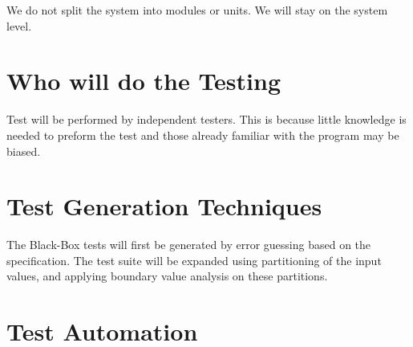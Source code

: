 \documentclass[11pt,a4paper]{article}
\begin{document}
We do not split the system into modules or units. We will stay on the system level.


\section{Who will do the Testing}

Test will be performed by independent testers. This is because little
knowledge is needed to preform the test and those already familiar
with the program may be biased.     \label{sec:test-generation} %





\section{Test Generation Techniques}
The Black-Box tests will first be generated by error guessing based on the specification. The test suite will be expanded using partitioning of the input values, and applying boundary value analysis on these partitions.






\section{Test Automation}\label{sec:test-automation}
\end{document}
